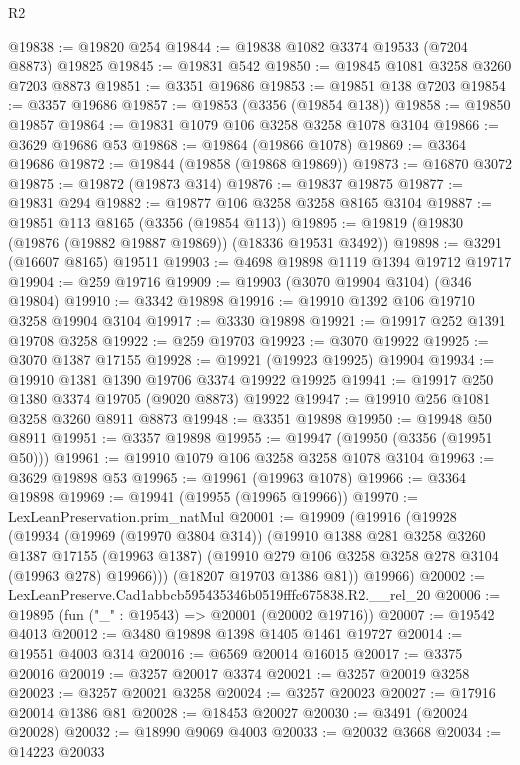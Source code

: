 \begin{lexlean}{R2}
\begin{coremodule}
@19838 := @19820 @254
@19844 := @19838 @1082 @3374 @19533 (@7204 @8873) @19825
@19845 := @19831 @542
@19850 := @19845 @1081 @3258 @3260 @7203 @8873
@19851 := @3351 @19686
@19853 := @19851 @138 @7203
@19854 := @3357 @19686
@19857 := @19853 (@3356 (@19854 @138))
@19858 := @19850 @19857
@19864 := @19831 @1079 @106 @3258 @3258 @1078 @3104
@19866 := @3629 @19686 @53
@19868 := @19864 (@19866 @1078)
@19869 := @3364 @19686
@19872 := @19844 (@19858 (@19868 @19869))
@19873 := @16870 @3072
@19875 := @19872 (@19873 @314)
@19876 := @19837 @19875
@19877 := @19831 @294
@19882 := @19877 @106 @3258 @3258 @8165 @3104
@19887 := @19851 @113 @8165 (@3356 (@19854 @113))
@19895 := @19819 (@19830 (@19876 (@19882 @19887 @19869)) (@18336 @19531 @3492))
@19898 := @3291 (@16607 @8165) @19511
@19903 := @4698 @19898 @1119 @1394 @19712 @19717
@19904 := @259 @19716
@19909 := @19903 (@3070 @19904 @3104) (@346 @19804)
@19910 := @3342 @19898
@19916 := @19910 @1392 @106 @19710 @3258 @19904 @3104
@19917 := @3330 @19898
@19921 := @19917 @252 @1391 @19708 @3258
@19922 := @259 @19703
@19923 := @3070 @19922
@19925 := @3070 @1387 @17155
@19928 := @19921 (@19923 @19925) @19904
@19934 := @19910 @1381 @1390 @19706 @3374 @19922 @19925
@19941 := @19917 @250 @1380 @3374 @19705 (@9020 @8873) @19922
@19947 := @19910 @256 @1081 @3258 @3260 @8911 @8873
@19948 := @3351 @19898
@19950 := @19948 @50 @8911
@19951 := @3357 @19898
@19955 := @19947 (@19950 (@3356 (@19951 @50)))
@19961 := @19910 @1079 @106 @3258 @3258 @1078 @3104
@19963 := @3629 @19898 @53
@19965 := @19961 (@19963 @1078)
@19966 := @3364 @19898
@19969 := @19941 (@19955 (@19965 @19966))
@19970 := LexLeanPreservation.prim_natMul
@20001 := @19909
    (@19916
      (@19928
        (@19934
          (@19969 (@19970 @3804 @314))
          (@19910
            @1388
            @281
            @3258
            @3260
            @1387
            @17155
            (@19963 @1387)
            (@19910 @279 @106 @3258 @3258 @278 @3104 (@19963 @278) @19966)))
        (@18207 @19703 @1386 @81))
      @19966)
@20002 := LexLeanPreserve.Cad1abbcb595435346b0519fffc675838.R2.__rel_20
@20006 := @19895 (fun ("_" : @19543) => @20001 (@20002 @19716))
@20007 := @19542 @4013
@20012 := @3480 @19898 @1398 @1405 @1461 @19727
@20014 := @19551 @4003 @314
@20016 := @6569 @20014 @16015
@20017 := @3375 @20016
@20019 := @3257 @20017 @3374
@20021 := @3257 @20019 @3258
@20023 := @3257 @20021 @3258
@20024 := @3257 @20023
@20027 := @17916 @20014 @1386 @81
@20028 := @18453 @20027
@20030 := @3491 (@20024 @20028)
@20032 := @18990 @9069 @4003
@20033 := @20032 @3668
@20034 := @14223 @20033

\end{coremodule}
\end{lexlean}
